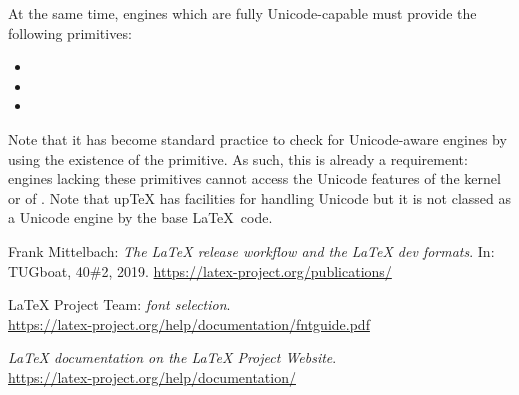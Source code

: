 \documentclass{ltnews}
\begin{document}
At the same time, engines which are fully Unicode-capable must provide
the following primitives:
%
\begingroup\setlength\columnsep{0pt}
\begin{multicols}{2}
\begin{itemize}
  \item {}
  \item {}
  \item {}
\end{itemize}
\end{multicols}
\endgroup
%
Note that it has become standard practice to check for Unicode-aware engines
by using the existence of the  primitive. As such, this is already
a requirement: engines lacking these primitives cannot access the Unicode features
of the \LaTeXe{} kernel or of . Note that up\TeX{} has facilities for
handling Unicode but it is not classed as a Unicode engine by the base \LaTeX\ code.

\begin{thebibliography}{9}

\fontsize{9.3}{11.3}\selectfont

 Frank Mittelbach:
  \emph{The
  \LaTeX{} release workflow and the \LaTeX{} dev formats}.
  In: TUGboat, 40\#2, 2019.
  \url{https://latex-project.org/publications/}

 \LaTeX{} Project Team:
  \emph{\LaTeXe{} font selection}.\\
  \url{https://latex-project.org/help/documentation/fntguide.pdf}

  \emph{\LaTeX{} documentation on the \LaTeX{} Project Website}.\\
  \url{https://latex-project.org/help/documentation/}

\end{thebibliography}
\end{document}
